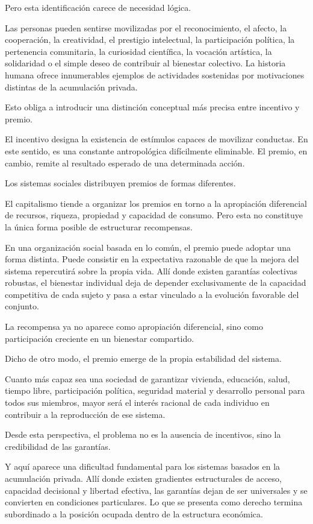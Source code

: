 \documentclass[11pt,a4paper]{article}
\begin{document}
Pero esta identificación carece de necesidad lógica.

Las personas pueden sentirse movilizadas por el reconocimiento, el afecto, la cooperación, la creatividad, el prestigio intelectual, la participación política, la pertenencia comunitaria, la curiosidad científica, la vocación artística, la solidaridad o el simple deseo de contribuir al bienestar colectivo. La historia humana ofrece innumerables ejemplos de actividades sostenidas por motivaciones distintas de la acumulación privada.

Esto obliga a introducir una distinción conceptual más precisa entre incentivo y premio.

El incentivo designa la existencia de estímulos capaces de movilizar conductas. En este sentido, es una constante antropológica difícilmente eliminable. El premio, en cambio, remite al resultado esperado de una determinada acción.

Los sistemas sociales distribuyen premios de formas diferentes.

El capitalismo tiende a organizar los premios en torno a la apropiación diferencial de recursos, riqueza, propiedad y capacidad de consumo. Pero esta no constituye la única forma posible de estructurar recompensas.

En una organización social basada en lo común, el premio puede adoptar una forma distinta. Puede consistir en la expectativa razonable de que la mejora del sistema repercutirá sobre la propia vida. Allí donde existen garantías colectivas robustas, el bienestar individual deja de depender exclusivamente de la capacidad competitiva de cada sujeto y pasa a estar vinculado a la evolución favorable del conjunto.

La recompensa ya no aparece como apropiación diferencial, sino como participación creciente en un bienestar compartido.

Dicho de otro modo, el premio emerge de la propia estabilidad del sistema.

Cuanto más capaz sea una sociedad de garantizar vivienda, educación, salud, tiempo libre, participación política, seguridad material y desarrollo personal para todos sus miembros, mayor será el interés racional de cada individuo en contribuir a la reproducción de ese sistema.

Desde esta perspectiva, el problema no es la ausencia de incentivos, sino la credibilidad de las garantías.

Y aquí aparece una dificultad fundamental para los sistemas basados en la acumulación privada. Allí donde existen gradientes estructurales de acceso, capacidad decisional y libertad efectiva, las garantías dejan de ser universales y se convierten en condiciones particulares. Lo que se presenta como derecho termina subordinado a la posición ocupada dentro de la estructura económica.
\end{document}
